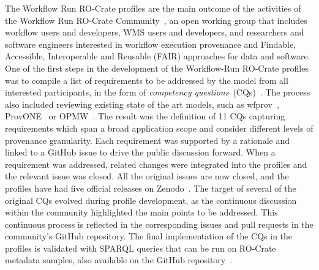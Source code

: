 The Workflow Run RO-Crate profiles are the main outcome of the activities of the Workflow Run RO-Crate Community~\cite{wrroc-site}, an open working group that includes workflow users and developers, WMS users and developers, and researchers and software engineers interested in workflow execution provenance and Findable, Accessible, Interoperable and Reusable (FAIR) approaches for data and software.
%
One of the first steps in the development of the Workflow-Run RO-Crate profiles was to compile a list of requirements to be addressed by the model from all interested participants, in the form of \textit{competency questions}~(CQs)~\cite{wrroc-cqs}.
%
The process also included reviewing existing state of the art models, such as wfprov~\cite{Belhajjame 2015}, ProvONE~\cite{Cuevas-Vicenttin 2016} or OPMW~\cite{Garijo 2011}. The result was the definition of 11 CQs capturing requirements which span a broad application scope and consider different levels of provenance granularity.
%
Each requirement was supported by a rationale and linked to a GitHub issue to drive the public discussion forward. When a requirement was addressed, related changes were integrated into the profiles and the relevant issue was closed. All the original issues are now closed, and the profiles have had five official releases on Zenodo~\cite{WRROC 2024a, WRROC 2024b, WRROC 2024c}.
%
The target of several of the original CQs evolved during profile development, as the continuous discussion within the community highlighted the main points to be addressed. This continuous process is reflected in the corresponding issues and pull requests in the community's GitHub repository. The final implementation of the CQs in the profiles is validated with SPARQL queries that can be run on RO-Crate metadata samples, also available on the GitHub repository~\cite{cqs-sparql-queries}.

